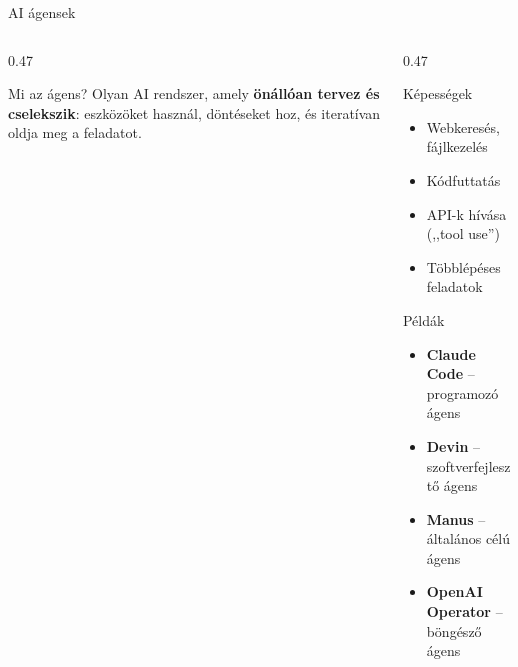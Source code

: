 \documentclass[aspectratio=169, 12pt]{beamer}
\begin{document}
\begin{frame}{AI ágensek}
  \footnotesize
  \begin{columns}[T,onlytextwidth]
    \begin{column}{0.47\textwidth}
      \begin{block}{Mi az ágens?}
        Olyan AI rendszer, amely \textbf{önállóan tervez és cselekszik}: eszközöket használ, döntéseket hoz, és iteratívan oldja meg a feladatot.
      \end{block}

      \vspace{0.2cm}

      \centering
    \end{column}
    \begin{column}{0.47\textwidth}
      \begin{exampleblock}{Képességek}
        \begin{itemize}\setlength{\itemsep}{1pt}
          \item Webkeresés, fájlkezelés
          \item Kódfuttatás
          \item API-k hívása (,,tool use'')
          \item Többlépéses feladatok
        \end{itemize}
      \end{exampleblock}

      \vspace{0.1cm}

      \begin{block}{Példák}
        \begin{itemize}\setlength{\itemsep}{1pt}
          \item \textbf{Claude Code} -- programozó ágens
          \item \textbf{Devin} -- szoftverfejlesztő ágens
          \item \textbf{Manus} -- általános célú ágens
          \item \textbf{OpenAI Operator} -- böngésző ágens
        \end{itemize}
      \end{block}
    \end{column}
  \end{columns}
\end{frame}
\end{document}

